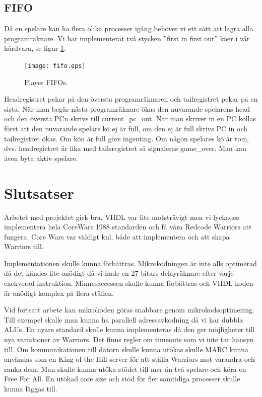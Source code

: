 \documentclass[11pt]{article}
\begin{document}
\newpage
\subsection{FIFO}

Då en spelare kan ha flera olika processer igång behöver vi ett sätt att lagra alla programräknare. Vi har implementerat två stycken ”first in first out” köer i vår hårdvara, se figur \ref{fig:fifo}.

\begin{figure}[h]
    \begin{center}
        \texttt{[image: fifo.eps]}
        \caption{Player FIFOs.}
        \label{fig:fifo}
    \end{center}
\end{figure}

Headregistret pekar på den översta programräknaren och tailregistret pekar på en sista. När man begär nästa programräknare ökas den nuvarande spelarens head och den översta PCn skrivs till current\_pc\_out. När man skriver in en PC kollas först att den nuvarande spelars kö ej är full, om den ej är full skrivs PC in och tailregistret ökas. Om kön är full görs ingenting. Om någon spelares kö är tom, dvs. headregistret är lika med tailsregistret så signaleras game\_over. Man kan även byta aktiv spelare.


\newpage

\section{Slutsatser}

Arbetet med projektet gick bra, VHDL var lite motsträvigt men vi lyckades implementera hela CoreWars 1988 standarden och få våra Redcode Warriors att fungera. Core Wars var väldigt kul, både att implementera och att skapa Warriors till.

Implementationen skulle kunna förbättras. Mikrokodningen är inte alls optimerad då det kändes lite onödigt då vi hade en 27 bitars delayräknare efter varje exekverad instruktion. Minnesaccessen skulle kunna förbättras och VHDL koden är onödigt komplex på flera ställen.

Vid fortsatt arbete kan mikrokoden göras snabbare genom mikrokodsoptimering. Till exempel skulle man kunna ha parallell adressavkodning då vi har dubbla ALUs. En nyare standard skulle kunna implementeras då den ger möjligheter till nya variationer av Warriors. Det finns regler om timeouts som vi inte tar hänsyn till. Om kommunikationen till datorn skulle kunna utökas skulle MARC kunna användas som en King of the Hill server för att ställa Warriors mot varandra och ranka dem. Man skulle kunna utöka stödet till mer än två spelare och köra en Free For All. En utökad core size och stöd för fler samtidiga processer skulle kunna läggas till.
\end{document}
